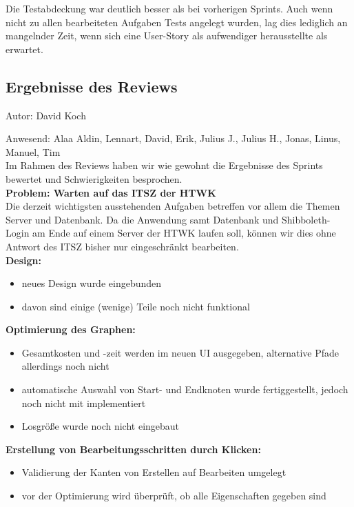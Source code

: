 Die Testabdeckung war deutlich besser als bei vorherigen Sprints. Auch wenn nicht zu allen bearbeiteten Aufgaben Tests angelegt wurden, lag dies lediglich an mangelnder Zeit, wenn sich eine User-Story als aufwendiger herausstellte als erwartet.

\subsection{Ergebnisse des Reviews}
{\small Autor: David Koch}

Anwesend: Alaa Aldin, Lennart, David, Erik, Julius J., Julius H., Jonas, Linus, Manuel, Tim\\

Im Rahmen des Reviews haben wir wie gewohnt die Ergebnisse des Sprints bewertet und Schwierigkeiten besprochen.\\

\textbf{Problem: Warten auf das ITSZ der HTWK}\\
Die derzeit wichtigsten ausstehenden Aufgaben betreffen vor allem die Themen Server und Datenbank. Da die Anwendung samt Datenbank und Shibboleth-Login am Ende auf einem Server der HTWK laufen soll, können wir dies ohne Antwort des ITSZ bisher nur eingeschränkt bearbeiten. \\

\textbf{Design:}
\begin{itemize}
\item neues Design wurde eingebunden
\item davon sind einige (wenige) Teile noch nicht funktional 
\end{itemize}

\textbf{Optimierung des Graphen:}
\begin{itemize}
\item Gesamtkosten und -zeit werden im neuen UI ausgegeben, alternative Pfade allerdings noch nicht
\item automatische Auswahl von Start- und Endknoten wurde fertiggestellt, jedoch noch nicht mit implementiert
\item Losgröße wurde noch nicht eingebaut
\end{itemize}

\textbf{Erstellung von Bearbeitungsschritten durch Klicken:}
\begin{itemize}
\item Validierung der Kanten von Erstellen auf Bearbeiten umgelegt
\item vor der Optimierung wird überprüft, ob alle Eigenschaften gegeben sind
\end{itemize}

